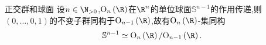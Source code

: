 \begin{example}{正交群和球面}{}
	设$n\in\N_{>0}$,$\mathrm{O}_{n}\left(\R\right)$在$\R^{n}$的单位球面$\mathbb{S}^{n-1}$的作用传递,则$\left(0,\ldots,0,1\right)$的不变子群同构于$\mathrm{O}_{n-1}\left(\R\right)$,故有$\mathrm{O}_{n}\left(\R\right)$-集同构
	\begin{align*}
		\mathbb{S}^{n-1}\simeq\mathrm{O}_{n}\left(\R\right)/\mathrm{O}_{n-1}\left(\R\right).
	\end{align*}
\end{example}


























